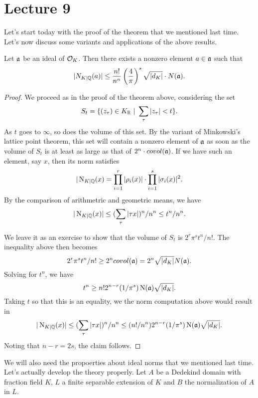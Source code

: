 \section{Lecture 9}

Let's start today with the proof of the theorem that we mentioned last time.
Let's now discuss some variants and applications of the above results.
\begin{theorem}
  Let $\mathfrak{a}$ be an ideal of $\mathcal{O}_{K}$.
  Then there exists a nonzero element $a \in \mathfrak{a}$ such that
  \[ |N_{K|\mathbb{Q}}(a)| \leq \frac{n!}{n^{n}}\left(\frac{4}{\pi}\right)^{s} \sqrt{|d_{K}|} \cdot N(\mathfrak{a}). \]
\end{theorem}
\begin{proof}
  We proceed as in the proof of the theorem above, considering the set
  \[ S_{t} = \{ (z_{\tau}) \in K_{\mathbb{R}} \ | \  \sum_{\tau} | z_{\tau}| < t \}. \]
  As $t$ goes to $\infty$, so does the volume of this set.
  By the variant of Minkowski's lattice point theorem, this set will contain a nonzero element of $\mathfrak{a}$ as soon as the volume of $S_{t}$ is at least as large as that of $2^{n} \cdot covol(\mathfrak{a})$.
  If we have such an element, say $x$, then its norm satisfies
  \[ |\operatorname{N}_{K|\mathbb{Q}}(x) = \prod_{i = 1}^{r}|\rho_{i}(x)| \cdot \prod_{i = 1}^{s}|\sigma_{i}(x)|^{2}. \]
  By the comparison of arithmetric and geometric means, we have
  \[ |\operatorname{N}_{K|\mathbb{Q}}(x)| \leq (\sum_{\tau}|\tau x|)^{n}/n^{n} \leq t^{n}/n^{n}. \]

  We leave it as an exercise to show that the volume of $S_{t}$ is $2^{r}\pi^{s}t^{n}/n!$.
  The inequality above then becomes
  \[ 2^{r}\pi^{s}t^{n}/n! \geq 2^{n} covol(\mathfrak{a}) = 2^{n} \sqrt{|d_{K}|} N(\mathfrak{a}). \]
  Solving for $t^{n}$, we have
  \[ t^{n} \geq n! 2^{n-r} (1/\pi^{s}) \operatorname{N}(\mathfrak{a}) \sqrt{|d_{K}|}. \]
  Taking $t$ so that this is an equality, we the norm computation above would result in
  \[ |\operatorname{N}_{K|\mathbb{Q}}(x)| \leq (\sum_{\tau}|\tau x|)^{n}/n^{n} \leq (n!/n^{n}) 2^{n-r} (1/\pi^{s}) \operatorname{N}(\mathfrak{a}) \sqrt{|d_{K}|}. \]
  Noting that $n - r = 2s$, the claim follows.
\end{proof}

We will also need the propoerties about ideal norms that we mentioned last time.
Let's actually develop the theory properly.
Let $A$ be a Dedekind domain with fraction field $K$, $L$ a finite separable extension of $K$ and $B$ the normalization of $A$ in $L$.

